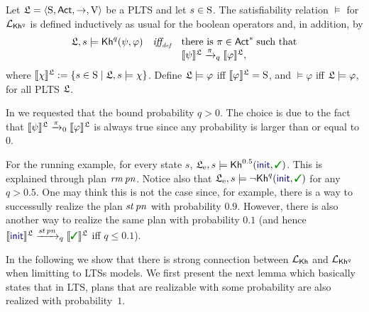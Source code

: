 \begin{definition}\label{def:semantics:PKh}
  Let $\model = \tup{\S,\Act,\ra,\V}$ be a PLTS and let $s\in\S$.  The
  satisfiability relation $\models$ for $\PKh$ is defined inductively 
  as usual for the boolean operators and, in addition, by
  \[
  \begin{array}{l@{\ \ \ }c@{\ \ \  }l}
    \model, s \models \kh^q(\psi,\varphi) & \iffdef & \text{there is } \plan \in \Act^* \;\text{such that} \\
    & & \truthset{\model}{\psi} \reach{\plan}_q \truthset{\model}{\varphi}, 
  \end{array}
  \]
  where $\truthset{\model}{\chi} := \csetsc{s\in\S}{\model,s\models\chi}$.
  Define $\model\models\varphi$ iff $\truthset{\model}{\varphi}=\S$,
  and $\models\varphi$ iff $\model\models\varphi$, for all PLTS
  $\model$.
\end{definition}

In  we requested that the bound probability
$q>0$.  The choice is due to the fact that $\truthset{\model}{\psi}
\reach{\plan}_0 \truthset{\model}{\varphi}$ is always true since any
probability is larger than or equal to $0$.

\begin{example}
  For the running example, for every state $s$,
  $\modelex, s \models \kh^{0.5}(\init,\goal)$.
  This is explained through plan $\ramp\,\panic$.
  Notice also that $\modelex, s \models \neg \kh^q(\init,\goal)$ for
  any $q>0.5$. One may think this is not the case since, for example,
  there is a way to successully realize the plan $\stairs\,\panic$
  with probability $0.9$.  However, there is also another way to
  realize the same plan with probability $0.1$ (and hence
  $\truthset{\model}{\init} \reach{\stairs\,\panic}_q \truthset{\model}{\goal}$
  iff $q\leq 0.1$).
\end{example}

In the following we show that there is strong connection between
$\Khlogic$ and $\PKh$ when limitting to LTSs models. We first present
the next lemma which basically states that in LTS, plans that are
realizable with some probability are also realized with
probability~$1$.

